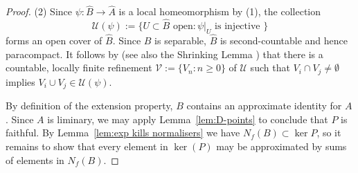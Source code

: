 \documentclass[12pt,a4paper]{amsart}
\newcommand{\Uu}{\mathcal{U}}
\newcommand{\Vv}{\mathcal{V}}
\begin{document}
\begin{proof}
(2)  Since $\psi : \widehat{B} \to \widehat{A}$ is a local
homeomorphism by (1), the collection
\[
\Uu(\psi) := \lbrace U \subset \widehat{B} \text{ open}
                     :\psi|_U  \text{ is injective }\rbrace
\]
forms an open cover of $\widehat{B}$.  Since $B$ is separable,
$\widehat{B}$ is second-countable and hence paracompact. It
follows by \cite[Lemma 2.1]{Kumjian1985} (see also the Shrinking
Lemma \cite[Lemma 4.32]{tfb}) that there is a countable, locally
finite refinement
$\Vv := \lbrace  V_n : n \ge 0\}$ of $\Uu$ such that $V_i \cap V_j \ne \emptyset$ implies $V_i \cup V_j \in \Uu(\psi)$.

By definition of the extension property, $B$ contains an
approximate identity for $A$. Since $A$ is liminary, we may
apply Lemma~\ref{lem:D-points} to conclude that $P$ is
faithful.   By Lemma~\ref{lem:exp kills normalisers} we have
$N_f(B)\subset\ker P$, so it remains to show that every element
in $\ker(P)$ may be approximated by sums of elements in
$N_f(B)$.


\end{proof}
\end{document}
